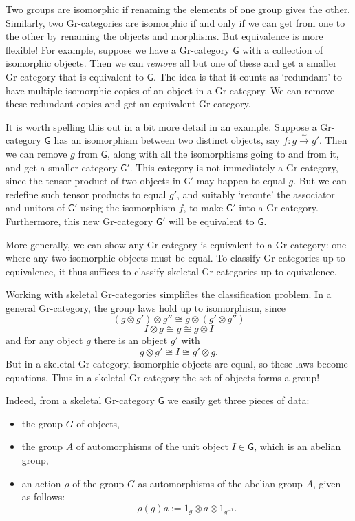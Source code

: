 \documentclass[reqno]{amsart}
\newcommand{\maps}{\colon}    %
\newcommand{\G}{{\mathsf{G}}}   %
\newcommand{\define}[1]{\textbf{\boldmath{#1}}}
\theoremstyle{definition}
\begin{document}
Two groups are isomorphic if renaming the elements of one group gives the other.  Similarly, two Gr-categories are isomorphic if and only if we can get from one to the other by renaming the objects and morphisms.  But equivalence is more flexible!   For example, suppose we have a Gr-category $\G$ with a collection of isomorphic objects.  Then we can \emph{remove} all but one of these and get a smaller Gr-category that is equivalent to $\G$.  The idea is that it counts as `redundant' to have multiple isomorphic copies of an object in a Gr-category.  We can remove these redundant copies and get an equivalent Gr-category.

It is worth spelling this out in a bit more detail in an example.  Suppose a Gr-category $\G$ has an isomorphism between two distinct objects, say $f \maps g \xrightarrow{\, \sim \, } g'$.  Then we can remove $g$ from $\G$, along with all the isomorphisms going to and from it, and get a smaller category $\G'$.  This category is not immediately a Gr-category, since the tensor product of two objects in $\G'$ may happen to equal $g$.  But we can redefine such tensor products to equal $g'$, and suitably `reroute' the associator and unitors of $\G'$ using the isomorphism $f$, to make $\G'$ into a Gr-category.   Furthermore, this new Gr-category $\G'$ will be equivalent to $\G$.

More generally, we can show any Gr-category is equivalent to a \define{skeletal} Gr-category: one where any two isomorphic objects must be equal.   To classify Gr-categories up to equivalence, it thus suffices to classify skeletal Gr-categories up to equivalence.

Working with skeletal Gr-categories simplifies the classification problem.   In a general Gr-category, the group laws hold up to isomorphism, since
\[    (g \otimes g') \otimes g'' \cong g \otimes (g' \otimes g'') \]
\[      I \otimes g \cong g \cong g \otimes I  \]
and for any object $g$ there is an object $g'$ with
\[      g \otimes g' \cong I \cong g' \otimes g. \]
But in a skeletal Gr-category, isomorphic objects are equal, so these laws become equations.  Thus in a skeletal Gr-category the set of objects forms a group!  

Indeed, from a skeletal Gr-category $\G$ we easily get three pieces of data:
\begin{itemize}
\item the group $G$ of objects,
\item the group $A$ of automorphisms of the unit object $I \in \G$, which is an abelian group,
\item an action $\rho$ of the group $G$ as automorphisms of the abelian 
group $A$, given as follows:
\[     \rho(g)a := 1_g \otimes a \otimes 1_{g^{-1}} .\]
\end{itemize}
\end{document}
